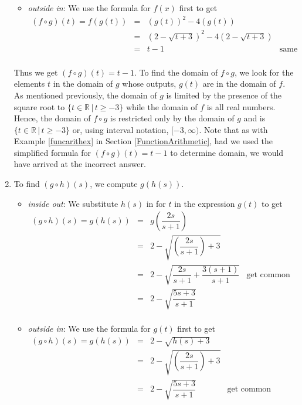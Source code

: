 \begin{ex}
\begin{enumerate}
\begin{itemize}
\item  \textit{outside in}:  We use the formula for $f(x)$ first to get
\[
\begin{array}{rclr} (f \circ g)(t) = f(g(t))& = &\left(g(t)\right)^2 - 4\left(g(t)\right)& \\ [2pt]
 & = & \left(2-\sqrt{t+3}\right)^2 - 4\left(2-\sqrt{t+3}\right) & \\[2pt] 
 & = & t-1 & \text{same algebra as before} \\
 \end{array}
\]
\end{itemize}

Thus we get $(f \circ g)(t) = t-1$.  To find the domain of $f \circ g$, we look for the elements $t$ in the domain of $g$ whose outputs, $g(t)$ are in the domain of $f$.   As mentioned previously, the domain of $g$ is limited by the presence of the square root to  $\{ t \in \mathbb{R} \, | \, t \geq -3\}$  while the domain of $f$ is all real numbers.  Hence,  the domain of $f \circ g$ is restricted only by the domain of $g$ and is $\{ t \in \mathbb{R} \, | \, t \geq -3\}$ or, using interval notation,  $[-3, \infty)$.  Note that as with Example \ref{funcarithex}  in Section \ref{FunctionArithmetic}, had we used the simplified formula for $(f \circ g)(t) = t-1$  to determine domain, we would have arrived at the incorrect answer.



\item  To find $(g \circ h)(s)$, we compute $g(h(s))$. 

\begin{itemize}

\item  \textit{inside out}: We substitute $h(s)$ in for $t$ in the expression $g(t)$  to get
\[
\begin{array}{rclr} (g \circ h)(s) = g(h(s)) & = &g\left(\dfrac{2s}{s+1}\right)  & \\ [12pt]
 & = & 2 - \sqrt{\left(\dfrac{2s}{s+1}\right)+3} & \\[12pt] 
 & = & 2 - \sqrt{\dfrac{2s}{s+1} + \dfrac{3(s+1)}{s+1}} & \text{get common denominators}\\ [12pt]
 & = & 2 - \sqrt{\dfrac{5s+3}{s+1}} & \\
 \end{array}
\]

\item  \textit{outside in}:  We use the formula for $g(t)$ first to get
\[
\begin{array}{rclr} (g \circ h)(s)  = g(h(s)) & = & 2 - \sqrt{h(s)+3}& \\ [2pt]
  & = & 2 - \sqrt{\left(\dfrac{2s}{s+1}\right)+3} & \\[12pt] 
 & = & 2 - \sqrt{\dfrac{5s+3}{s+1}} & \text{get common denominators as before}\\
 \end{array}
\]
\end{itemize}


\end{enumerate}
\end{ex}
